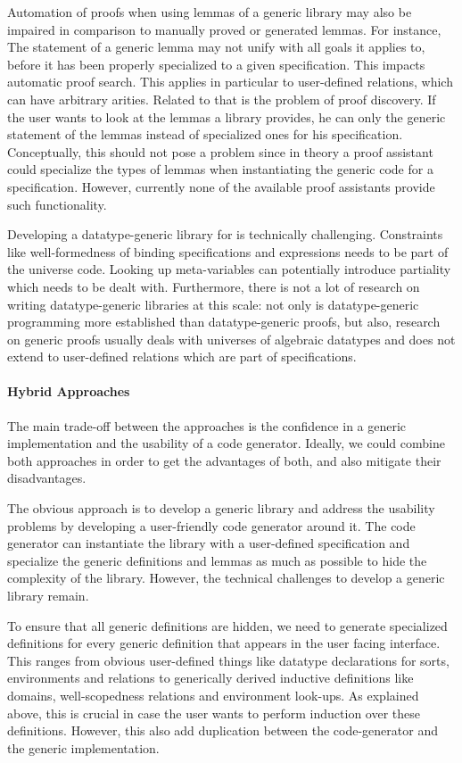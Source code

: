 Automation of proofs when using lemmas of a generic library may also be impaired
in comparison to manually proved or generated lemmas. For instance, The
statement of a generic lemma may not unify with all goals it applies to, before
it has been properly specialized to a given specification. This impacts
automatic proof search. This applies in particular to user-defined relations,
which can have arbitrary arities. Related to that is the problem of proof
discovery. If the user wants to look at the lemmas a library provides, he can
only the generic statement of the lemmas instead of specialized ones for his
specification. Conceptually, this should not pose a problem since in theory a
proof assistant could specialize the types of lemmas when instantiating the
generic code for a specification. However, currently none of the available proof
assistants provide such functionality.

Developing a datatype-generic library for \Knot is technically challenging.
Constraints like well-formedness of binding specifications and expressions needs
to be part of the universe code. Looking up meta-variables can potentially
introduce partiality which needs to be dealt with. Furthermore, there is not a
lot of research on writing datatype-generic libraries at this scale: not only is
datatype-generic programming more established than datatype-generic proofs, but
also, research on generic proofs usually deals with universes of algebraic
datatypes and does not extend to user-defined relations which are part of \Knot
specifications.

\paragraph{Hybrid Approaches}

The main trade-off between the approaches is the confidence in a generic
implementation and the usability of a code generator. Ideally, we could combine
both approaches in order to get the advantages of both, and also mitigate their
disadvantages.

The obvious approach is to develop a generic library and address the usability
problems by developing a user-friendly code generator around it. The code
generator can instantiate the library with a user-defined specification and
specialize the generic definitions and lemmas as much as possible to hide the
complexity of the library. However, the technical challenges to develop a
generic library remain.

To ensure that all generic definitions are hidden, we need to generate
specialized definitions for every generic definition that appears in the user
facing interface. This ranges from obvious user-defined things like datatype
declarations for sorts, environments and relations to generically derived
inductive definitions like domains, well-scopedness relations and environment
look-ups. As explained above, this is crucial in case the user wants to perform
induction over these definitions. However, this also add duplication between the
code-generator and the generic implementation.

